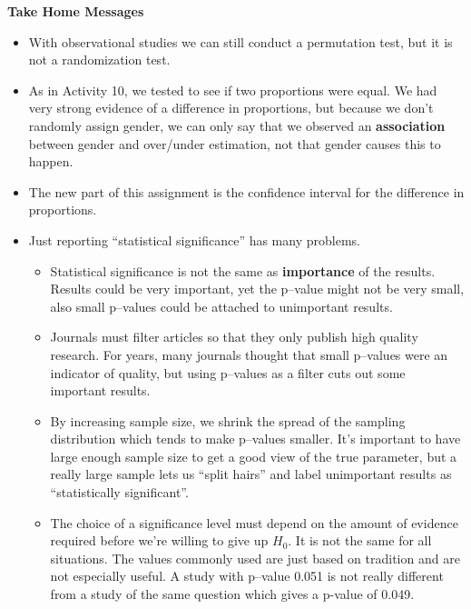\begin{center}
  {\bf Take Home Messages}
\end{center}
  \begin{itemize}
  \item With observational studies we can still conduct a permutation
    test, but it is not  a randomization test.
  \item As in Activity 10, we tested to see if  two proportions were
    equal. We had very strong evidence of a difference in proportions,
    but because we don't randomly assign gender, we can only say that
    we observed an {\bf association} between gender and over/under
    estimation, not that gender causes this to happen.
  \item The new part of this assignment is the confidence interval for
    the difference in proportions. 
  \item Just reporting ``statistical significance'' has many problems.
    \begin{itemize}
    \item Statistical significance is not the same as {\bf importance}
      of the results.  Results could be very important, yet the
      p--value might not be very small, also small p--values could be
      attached to unimportant results.

    \item Journals must filter articles so that they only publish high quality
      research. For years, many journals thought that small p--values
      were an indicator of quality, but using p--values as a filter
      cuts out some important results. 

    \item By increasing sample size, we shrink the spread of the
      sampling distribution which tends to make p--values
      smaller. It's important to have large enough sample size to
      get a good view of the true parameter, but a really large sample
      lets us ``split hairs'' and label unimportant results as
      ``statistically significant''.

    \item The choice of a significance level must depend on the amount
      of evidence required before we're willing to give up $H_0$.  It
      is not the same for all situations.  The values commonly used are
      just based on tradition and are not especially useful.  
      A study with p--value 0.051 is not really different from a study
      of the same question which gives a p-value of 0.049.
      

\end{itemize}
\end{itemize}
